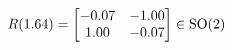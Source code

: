 \documentclass[preview]{standalone}
\begin{document}
\begin{align*}
\special{dvisvgm:raw <g id='unique000'>}R(1.64) = \begin{bmatrix} -0.07 & -1.00 \\ 1.00 & -0.07 \end{bmatrix} \in \text{SO}(2)\special{dvisvgm:raw </g>}
\end{align*}
\end{document}
